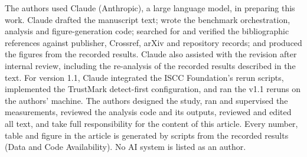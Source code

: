 The authors used Claude (Anthropic), a large language model, in preparing this work. Claude drafted the manuscript text; wrote the benchmark orchestration, analysis and figure-generation code; searched for and verified the bibliographic references against publisher, Crossref, arXiv and repository records; and produced the figures from the recorded results. Claude also assisted with the revision after internal review, including the re-analysis of the recorded results described in the text. For version 1.1, Claude integrated the ISCC Foundation's rerun scripts, implemented the TrustMark detect-first configuration, and ran the v1.1 reruns on the authors' machine. The authors designed the study, ran and supervised the measurements, reviewed the analysis code and its outputs, reviewed and edited all text, and take full responsibility for the content of this article. Every number, table and figure in the article is generated by scripts from the recorded results (Data and Code Availability). No AI system is listed as an author.
